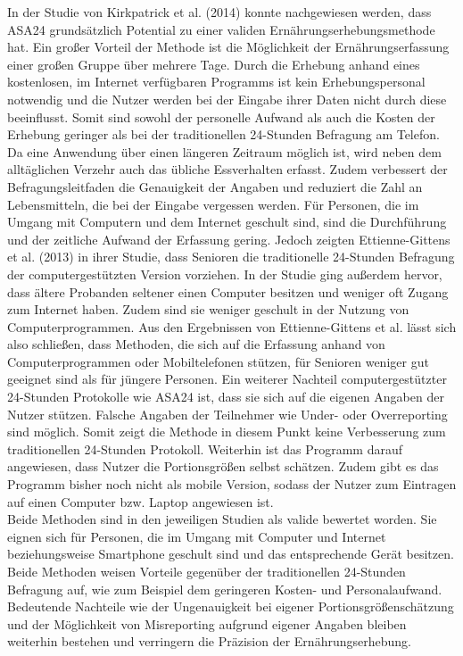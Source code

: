 In der Studie von Kirkpatrick et al. (2014) konnte nachgewiesen werden, dass ASA24 grundsätzlich Potential zu einer validen Ernährungserhebungsmethode hat. Ein großer Vorteil der Methode ist die Möglichkeit der  Ernährungserfassung einer großen Gruppe über mehrere Tage. Durch die Erhebung anhand eines kostenlosen, im Internet verfügbaren Programms ist kein Erhebungspersonal notwendig und die Nutzer werden bei der Eingabe ihrer Daten nicht durch diese beeinflusst. Somit sind sowohl der personelle Aufwand als auch die Kosten der Erhebung geringer als bei der traditionellen 24-Stunden Befragung am Telefon. Da eine Anwendung über einen längeren Zeitraum möglich ist, wird neben dem alltäglichen Verzehr auch das übliche Essverhalten erfasst. Zudem verbessert der Befragungsleitfaden die Genauigkeit der Angaben und reduziert die Zahl an Lebensmitteln, die bei der Eingabe vergessen werden.  Für Personen, die im Umgang mit Computern und dem Internet geschult sind, sind die Durchführung und der zeitliche Aufwand der Erfassung gering. Jedoch zeigten Ettienne-Gittens et al. (2013) in ihrer Studie, dass Senioren die traditionelle 24-Stunden Befragung der computergestützten Version vorziehen. In der Studie ging außerdem hervor, dass ältere Probanden seltener einen Computer besitzen und weniger oft Zugang zum Internet haben. Zudem sind sie weniger geschult in der Nutzung von Computerprogrammen. Aus den Ergebnissen von Ettienne-Gittens et al. lässt sich also schließen, dass Methoden, die sich auf die Erfassung anhand von Computerprogrammen oder Mobiltelefonen stützen, für Senioren weniger gut geeignet sind als für jüngere Personen. Ein weiterer Nachteil computergestützter 24-Stunden Protokolle wie ASA24 ist, dass sie sich auf die eigenen Angaben der Nutzer stützen. Falsche Angaben der Teilnehmer wie Under- oder Overreporting sind möglich. Somit zeigt die Methode in diesem Punkt keine Verbesserung zum traditionellen 24-Stunden Protokoll. Weiterhin ist das Programm darauf angewiesen, dass Nutzer die Portionsgrößen selbst schätzen. Zudem gibt es das Programm bisher noch nicht als mobile Version, sodass der Nutzer zum Eintragen auf einen Computer bzw. Laptop angewiesen ist. \\
Beide Methoden sind in den jeweiligen Studien als valide bewertet worden. Sie eignen sich für Personen, die im Umgang mit Computer und Internet beziehungsweise Smartphone geschult sind und das entsprechende Gerät besitzen. Beide Methoden weisen Vorteile gegenüber der traditionellen 24-Stunden Befragung auf, wie zum Beispiel dem geringeren Kosten- und Personalaufwand. Bedeutende Nachteile wie der Ungenauigkeit bei eigener Portionsgrößenschätzung und der Möglichkeit von Misreporting aufgrund eigener Angaben bleiben weiterhin bestehen und verringern die Präzision der Ernährungserhebung. 

